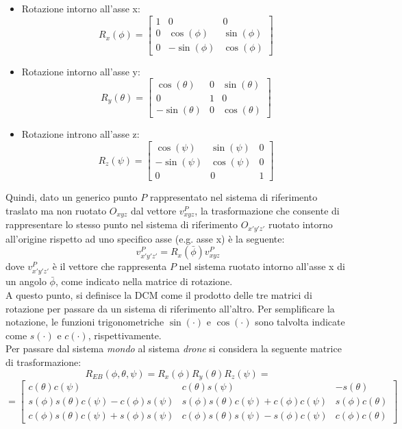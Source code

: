 \begin{itemize}
	\item Rotazione intorno all'asse x:
	\begin{equation}
	R_x(\phi) = 
	\begin{bmatrix}
		1 & 0 & 0\\
		0 & \cos(\phi) & \sin(\phi)\\
		0 & -\sin(\phi) & \cos(\phi)
	\end{bmatrix}
	\end{equation}
	\item Rotazione intorno all'asse y:
	\begin{equation}
	R_y(\theta) = 
	\begin{bmatrix}
		\cos(\theta) & 0 & \sin(\theta)\\
		0 & 1 & 0\\
		-\sin(\theta) & 0 & \cos(\theta)
	\end{bmatrix}
	\end{equation}
	\item Rotazione introno all'asse z:
	\begin{equation}
	R_z(\psi) = 
	\begin{bmatrix}
		\cos(\psi) & \sin(\psi) & 0\\
		-\sin(\psi) & \cos(\psi) & 0\\
		0 & 0 & 1
	\end{bmatrix}
	\end{equation}
\end{itemize}

Quindi, dato un generico punto $P$ rappresentato nel sistema di riferimento traslato ma non ruotato $O_{xyz}$ dal vettore $v^P_{xyz}$, la trasformazione che consente di rappresentare lo stesso punto nel sistema di riferimento $O_{x'y'z'}$ ruotato intorno all'origine rispetto ad uno specifico asse (e.g. asse x) è la seguente:
\[ v^P_{x'y'z'} =  R_x(\bar{\phi})v^P_{xyz}\]
dove $v^P_{x'y'z'}$ è il vettore che rappresenta $P$ nel sistema ruotato intorno all'asse x di un angolo $\bar{\phi}$, come indicato nella matrice di rotazione.\\

A questo punto, si definisce la \ac{DCM} come il prodotto delle tre matrici di rotazione per passare da un sistema di riferimento all'altro. Per semplificare la notazione, le funzioni trigonometriche  $\sin (\cdot)$ e $\cos (\cdot)$ sono talvolta indicate come $s(\cdot)$ e $c(\cdot)$, rispettivamente.\\

Per passare dal sistema \emph{mondo} al sistema \emph{drone} si considera la seguente matrice di trasformazione:
\[
R_{EB}(\phi,\theta,\psi) = 
R_x(\phi)R_y(\theta)R_z(\psi) = 
\]
\begin{equation}
=
\begin{bmatrix}
c(\theta)c(\psi) & c(\theta)s(\psi) & -s(\theta)\\
s(\phi)s(\theta)c(\psi)-c(\phi)s(\psi) & s(\phi)s(\theta)c(\psi)+c(\phi)c(\psi) & s(\phi)c(\theta)\\
c(\phi)s(\theta)c(\psi)+s(\phi)s(\psi) & c(\phi)s(\theta)s(\psi)-s(\phi)c(\psi) & c(\phi)c(\theta)
\end{bmatrix}
\label{dcmEB}
\end{equation}

